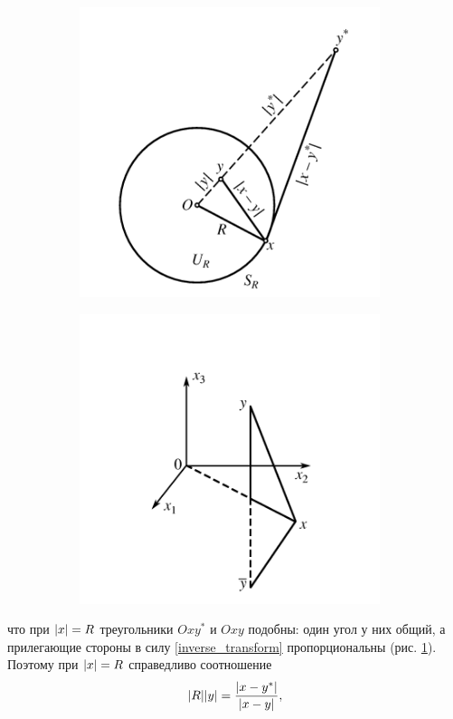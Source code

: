 	\begin{figure}[H]
		\centering
		\begin{subfigure}{0.4\textwidth}
			\centering
			\includegraphics[width=0.7\linewidth]{img/mirror4}
			\caption{}
			\label{img_a}
		\end{subfigure}
		\vspace{5mm}
		\begin{subfigure}{0.4\textwidth}
			\centering
			\includegraphics[width=0.7\linewidth]{img/mirror5}
			\caption{}
			\label{img_b}
		\end{subfigure}
		\caption{}
	\end{figure}
	что при $\abs{x} = R$ треугольники $Oxy^{\ast}$ и $Oxy$ подобны: один угол у них общий, а прилегающие стороны в силу \eqref{inverse_transform} пропорциональны (рис. \ref{img_a}). Поэтому при $\abs{x} = R$ справедливо соотношение 
	\begin{equation*}
		\abs{R}{\abs{y}} = \frac{\abs{x - y^{\ast}}}{\abs{x - y}},
	\end{equation*} 
